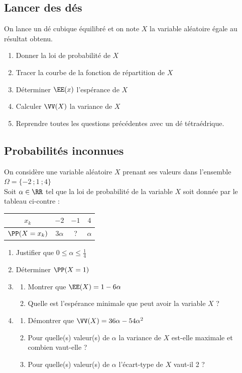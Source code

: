 \documentclass[oneside,12pt]{book}          %
\begin{document}
\subsection{Lancer des dés}
On lance un dé cubique équilibré et on note $X$ la variable aléatoire égale au résultat obtenu.
\begin{enumerate}
    \item Donner la loi de probabilité de $X$
    \item Tracer la courbe de la fonction de répartition de $X$
    \item Déterminer $\EE(x)$ l'espérance de $X$
    \item Calculer $\VV(X)$ la variance de $X$
    \item Reprendre toutes les questions précédentes avec un dé tétraédrique.
\end{enumerate}



\subsection{Probabilités inconnues}
On considère une variable aléatoire $X$ prenant ses valeurs dans l'ensemble $\Omega=\{-2~;1~;4\}$ \\
Soit $\alpha\in\RR$ tel que la loi de probabilité de la variable $X$ soit donnée par le tableau ci-contre :

\begin{center}
    \renewcommand{\arraystretch}{1.5}
    \setlength{\tabcolsep}{15pt}
    \begin{tabular}{|c|c|c|c|} \hline
    $x_k$ & $-2$ & $-1$ & $4$ \\ \hline
    $\PP(X=x_k)$ & $3\alpha$ & ? & $\alpha$ \\ \hline
    \end{tabular}
\end{center}
\begin{enumerate}
    \item Justifier que $0\leq\alpha\leq\frac{1}{4}$
    \item Déterminer $\PP(X=1)$
    \item \begin{enumerate}
        \item Montrer que $\EE(X)=1-6\alpha$
        \item Quelle est l'espérance minimale que peut avoir la variable $X$ ?
    \end{enumerate}
    \item \begin{enumerate}
        \item Démontrer que $\VV(X)=36\alpha-54\alpha^2$
        \item Pour quelle(s) valeur(s) de $\alpha$ la variance de $X$ est-elle maximale et combien vaut-elle ?
        \item Pour quelle(s) valeur(s) de $\alpha$ l'écart-type de $X$ vaut-il 2 ?
    \end{enumerate}
\end{enumerate}
\end{document}
